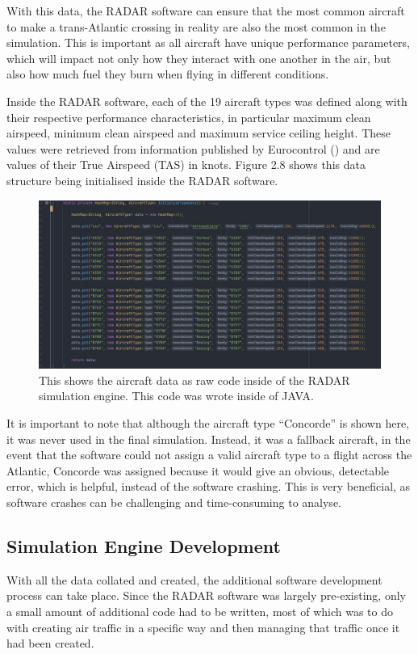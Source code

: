 \documentclass[stu, a4paper, 12pt, floatsintext]{apa7}
\numberwithin{figure}{section}
\numberwithin{table}{section}
\numberwithin{equation}{section}
\begin{document}
With this data, the RADAR software can ensure that the most common aircraft to make a trans-Atlantic crossing in reality are also the most common in the simulation. This is important as all aircraft have unique performance parameters, which will impact not only how they interact with one another in the air, but also how much fuel they burn when flying in different conditions.  

Inside the RADAR software, each of the 19 aircraft types was defined along with their respective performance characteristics, in particular maximum clean airspeed, minimum clean airspeed and maximum service ceiling height. These values were retrieved from information published by Eurocontrol (\cite{EUROCONTROLAircraftPerformance}) and are values of their True Airspeed (TAS) in knots. Figure 2.8 shows this data structure being initialised inside the RADAR software. 

\begin{figure}[H]
    \caption{This shows the aircraft data as raw code inside of the RADAR simulation engine. This code was wrote inside of JAVA.}
    \label{fig:2.8}
    \centering
    \includegraphics[width=1.1\textwidth]{pictures/Figure 2.8 FYP.jpg}    
\end{figure}

It is important to note that although the aircraft type “Concorde” is shown here, it was never used in the final simulation. Instead, it was a fallback aircraft, in the event that the software could not assign a valid aircraft type to a flight across the Atlantic, Concorde was assigned because it would give an obvious, detectable error, which is helpful, instead of the software crashing. This is very beneficial, as software crashes can be challenging and time-consuming to analyse.   

\subsection{Simulation Engine Development}
With all the data collated and created, the additional software development process can take place. Since the RADAR software was largely pre-existing, only a small amount of additional code had to be written, most of which was to do with creating air traffic in a specific way and then managing that traffic once it had been created. 
\end{document}
